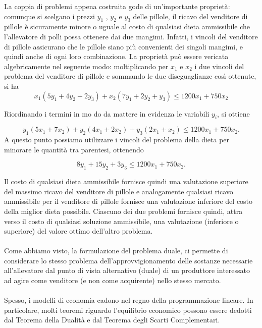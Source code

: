 \documentclass[a4paper,11pt]{article}
\begin{document}
La
coppia
di problemi
appena
costruita
gode
di un'importante proprietà:  comunque
si scelgano
i prezzi
$y_1$
,
$y_2$
e
$y_3$
delle
pillole,
il ricavo del
venditore
di pillole
è sicuramente
minore
o  uguale
al  costo
di
qualsiasi
dieta
ammissibile
che
l'allevatore
di polli
possa
ottenere
dai
due
mangimi.
Infatti,
i vincoli
del
venditore
di pillole
assicurano
che le pillole
siano
più convenienti dei
singoli
mangimi,
e quindi
anche
di ogni
loro
combinazione.
La
proprietà può essere
vericata
algebricamente nel
seguente modo:
moltiplicando
per
$x_1$
e
$x_2$
i due
vincoli
del
problema
del
venditore
di pillole
e sommando
le due
diseguaglianze
così ottenute,
si ha 
$$x_1(5y_1+4y_2+2y_3)+x_2(7y_1+2y_2+y_3) \leq 1200x_1+750x_2$$

Riordinando
i termini
in mo
do
da
mattere
in evidenza
le variabili
$y_i$, si ottiene

$$ y_1(5x_1+7x_2)+y_2(4x_1+2x_2)+y_3(2x_1+x_2) \leq 1200x_1+750x_2.$$
A questo
punto
possiamo
utilizzare
i vincoli
del
problema
della
dieta
per minorare
le
quantità tra
parentesi,
ottenendo

$$8y_1+15y_2+3y_3 \leq 1200x_1+750x_2.$$

Il costo
di qualsiasi
dieta
ammissibile
fornisce
quindi
una
valutazione
superiore
del
massimo
ricavo del
venditore
di pillole
e analogamente qualsiasi
ricavo ammissibile
per il venditore
di pillole
fornisce
una
valutazione
inferiore
del
costo
della
miglior
dieta
possibile.
Ciascuno
dei
due
problemi
fornisce
quindi,
attra
verso
il costo
di qualsiasi
soluzione
ammissibile,
una
valutazione
(inferiore
o superiore)
del
valore
ottimo
dell'altro
problema.
\\
\\
Come abbiamo visto, la formulazione del problema duale, ci permette di considerare lo
stesso problema dell’approvvigionamento delle sostanze necessarie all’allevatore dal punto
di vista alternativo (duale) di un produttore interessato ad agire come venditore (e non
come acquirente) nello stesso mercato.\\
\\
Spesso, i modelli di economia cadono nel regno della programmazione lineare. In particolare, molti teoremi riguardo l'equilibrio economico possono essere dedotti dal Teorema della Dualità e dal Teorema degli Scarti Complementari. 
\end{document}
